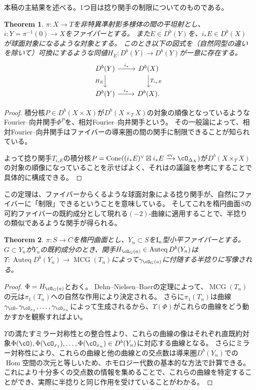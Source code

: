 \documentclass[uplatex,a4paper,dvipdfmx]{jsarticle}
\theoremstyle{plain}
\newtheorem{theorem}{Theorem}[section]
\theoremstyle{definition}
\DeclareMathOperator{\Hom}{\mathrm{Hom}}
\DeclareMathOperator{\Auteq}{\mathrm{Auteq}}
\DeclareMathOperator{\Cone}{\mathrm{Cone}}
\DeclareMathOperator{\ev}{\mathrm{ev}}
\DeclareMathOperator{\MCG}{\mathrm{MCG}}
\begin{document}
本稿の主結果を述べる。1つ目は捻り関手の制限についてのものである。
\begin{theorem}
	$\pi \colon X \to T$を非特異凖射影多様体の間の平坦射とし、$i \colon Y = \pi^{-1}(0) \to X$をファイバーとする。
	また$E \in D^b(Y)$を、$i_*E \in D^b(X)$が球面対象になるような対象とする。
	このとき以下の図式を（自然同型の違いを除いて）可換にするような同値$H_E \colon D^b(Y) \to D^b(Y)$が一意に存在する。
	\begin{equation}
		\begin{tikzcd}
			D^b(Y) \arrow[r,"i_*"]\arrow[d, "H_E"'] & D^b(X) \arrow[d,"T_{i_*E}"]\\
			D^b(Y) \arrow[r, "i_*"]& D^b(X).
		\end{tikzcd}
	\end{equation}
\end{theorem}
\begin{proof}
	積分核$P \in D^b(X \times X)$が$D^b(X \times_T X)$の対象の順像となっているようなFourier--向井関手$\Phi^P$を、相対Fourier--向井関手という。
	その一般論によって、相対Fourier--向井関手はファイバーの導来圏の間の関手に制限できることが知られている。

	よって捻り関手$T_{i_*E}$の積分核$P = \Cone((i_*E)^\vee \boxtimes i_*E \xrightarrow{\ev} \cO_{\Delta_X})$が$D^b(X \times_T X)$の対象の順像になっていることを示せばよく、それは\cite{MR2200048}の議論を参考にすることで具体的に構成できる。
\end{proof}
この定理は、ファイバーからくるような球面対象による捻り関手が、自然にファイバーに「制限」できるということを意味している。
そしてこれを楕円曲面$S$の可約ファイバーの既約成分として現れる$(-2)$-曲線に適用することで、半捻りの類似であるような関手が得られる。
\begin{theorem}
	$\pi \colon S \to C$を楕円曲面とし、$Y_n \subset S$を$\rm{I}_n$型小平ファイバーとする。
	$G \subset Y_n$が$Y_n$の既約成分のとき、関手$H_{\cO_G(a)} \in \Auteq D^b(Y_n)$は$\Upsilon \colon \Auteq D^b(Y_n) \to \MCG(T_n)$によって$\gamma_{\cO_G(a)}$に付随する半捻りに写像される。
\end{theorem}
\begin{proof}
	$\Phi = H_{\cO_G(a)}$とおく。
	Dehn--Nielsen--Baerの定理によって、$\MCG(T_n)$の元は$\pi_1(T_n)$への自然な作用により決定される。
	さらに$\pi_1(T_n)$は曲線$\gamma_\cO, \gamma_{\cO_{x_1}}, \dots, \gamma_{\cO_{x_n}}$によって生成されるから、$\Upsilon(\Phi)$がこれらの曲線をどう動かすかを観察すればよい。

	$\Upsilon$の満たすミラー対称性との整合性より、これらの曲線の像はそれぞれ直既約対象$\Phi(\cO), \Phi(\cO_{x_1}), \dots, \Phi(\cO_{x_n}) \in D^b(Y_n)$に対応する曲線となる。
	さらにミラー対称性により、これらの曲線と他の曲線との交点数は導来圏$D^b(Y_n)$での$\Hom$空間の次元と等しいため、ホモロジー代数の基本的な方法で計算できる。
	これにより十分多くの交点数の情報を集めることで、これらの曲線を特定することができ、実際に半捻りと同じ作用を受けていることがわかる。
\end{proof}
\end{document}
